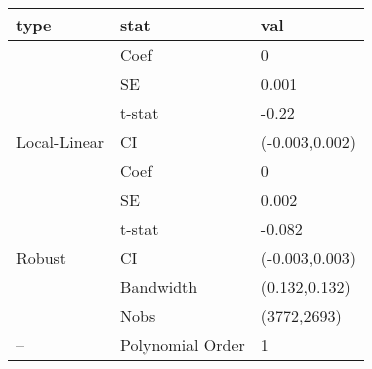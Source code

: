 
\begin{tabular}{lll}
\toprule
type & stat & val\\
\midrule
 & Coef & 0\\

 & SE & 0.001\\

 & t-stat & -0.22\\

\multirow{-4}{*}{\raggedright\arraybackslash Local-Linear} & CI & (-0.003,0.002)\\
\cmidrule{1-3}
 & Coef & 0\\

 & SE & 0.002\\

 & t-stat & -0.082\\

\multirow{-4}{*}{\raggedright\arraybackslash Robust} & CI & (-0.003,0.003)\\
\cmidrule{1-3}
 & Bandwidth & (0.132,0.132)\\

 & Nobs & (3772,2693)\\

\multirow{-3}{*}{\raggedright\arraybackslash --} & Polynomial Order & 1\\
\bottomrule
\end{tabular}